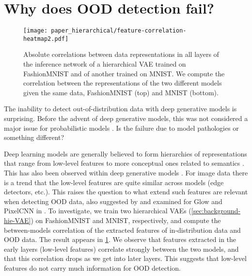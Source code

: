 \section{Why does OOD detection fail?}\label{sec:why-does-ood-fail}
\begin{figure}[t]
    \centering
    \texttt{[image: paper\_hierarchical/feature-correlation-heatmap2.pdf]}
    \vspace{0mm}
    \caption[Absolute correlations between data representations in all layers of the inference network of a hierarchical VAE trained on FashionMNIST and of another trained on MNIST.]{
    Absolute correlations between data representations in all layers of the inference network of a hierarchical VAE trained on FashionMNIST and of another trained on MNIST.
    We compute the correlation between the representations of the two different models given the same data, FashionMNIST (top) and MNIST (bottom).
    }
    \vspace{0mm}
    \label{fig:correlations-heatmap}
\end{figure}

The inability to detect out-of-distribution data with deep generative models is surprising.
Before the advent of deep generative models, this was not considered a major issue for probabilistic models \cite{bishop_novelty_1994}.
Is the failure due to model pathologies or something different?

Deep learning models are generally believed to form hierarchies of representations that range from low-level features to more conceptual ones related to semantics \parencite{bengio_representation_2013}.
This has also been observed within deep generative models \parencite{maaloe_biva_2019, child_very_2021}.
For image data there is a trend that the low-level features are quite similar across models (edge detectors, etc.). This raises the question to what extend such features are relevant when detecting OOD data, also suggested  by \cite{nalisnick_deep_2019} and examined for Glow and PixelCNN in \cite{schirrmeister_understanding_2020}.
To investigate, we train two hierarchical VAEs (\cref{sec:background-hie-VAE}) on FashionMNIST and MNIST, respectively, and compute the between-models correlation of the extracted features of in-distribution data and OOD data.
The result appears in \cref{fig:correlations-heatmap}.
We observe that features extracted in the early layers (low-level features) correlate strongly between the two models, and that this correlation drops as we get into later layers.
This suggests that low-level features do not carry much information for OOD detection.

